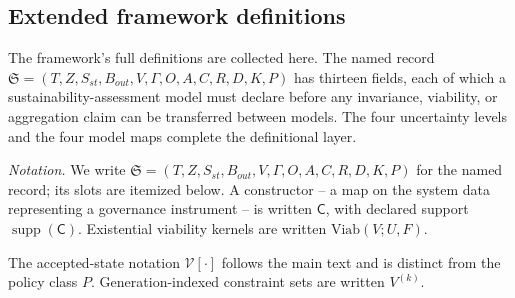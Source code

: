 \documentclass[preprint,11pt,authoryear]{elsarticle}
\theoremstyle{remark}
\begin{document}
\subsection{Extended framework definitions}

The framework's full definitions are collected here. The named record $\mathfrak{S} = (T, Z, S_{st}, B_{out}, V, \Gamma, O, A, C, R, D, K, P)$ has thirteen fields, each of which a sustainability-assessment model must declare before any invariance, viability, or aggregation claim can be transferred between models. The four uncertainty levels and the four model maps complete the definitional layer.

\emph{Notation.} We write $\mathfrak{S} = (T, Z, S_{st}, B_{out}, V, \Gamma, O, A, C, R, D, K, P)$ for the named record; its slots are itemized below. A constructor -- a map on the system data representing a governance instrument -- is written $\mathsf{C}$, with declared support $\operatorname{supp}(\mathsf{C})$. Existential viability kernels are written $\mathrm{Viab}(V; U, F)$.

The accepted-state notation $\mathcal{V}[\cdot]$ follows the main text and is distinct from the policy class $P$. Generation-indexed constraint sets are written $V^{(k)}$.
\end{document}
